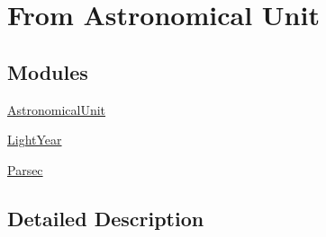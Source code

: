 \hypertarget{group___e_g_x_math-_conversions-_length_conversions-_astronomical}{}\section{From Astronomical Unit}
\label{group___e_g_x_math-_conversions-_length_conversions-_astronomical}
\subsection*{Modules}
\begin{DoxyCompactItemize}
\item 
\mbox{\hyperlink{group___e_g_x_math-_conversions-_length_conversions-_astronomical-_astronomical_unit}{Astronomical\+Unit}}
\item 
\mbox{\hyperlink{group___e_g_x_math-_conversions-_length_conversions-_astronomical-_light_year}{Light\+Year}}
\item 
\mbox{\hyperlink{group___e_g_x_math-_conversions-_length_conversions-_astronomical-_parsec}{Parsec}}
\end{DoxyCompactItemize}


\subsection{Detailed Description}
